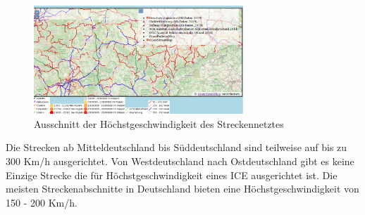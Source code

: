 \begin{figure}[h]
\centering
	\includegraphics[width=0.7\textwidth]{images/Analyse2.png}
	\caption{Ausschnitt der Höchstgeschwindigkeit des Streckennetztes}
\end{figure}
Die Strecken ab Mitteldeutschland bis Süddeutschland sind teilweise auf bis zu 300 Km/h ausgerichtet. Von Westdeutschland nach Ostdeutschland gibt es keine Einzige Strecke die für Höchstgeschwindigkeit eines ICE ausgerichtet ist.
Die meisten Streckenabschnitte in Deutschland bieten eine Höchstgeschwindigkeit von 150 - 200 Km/h.
